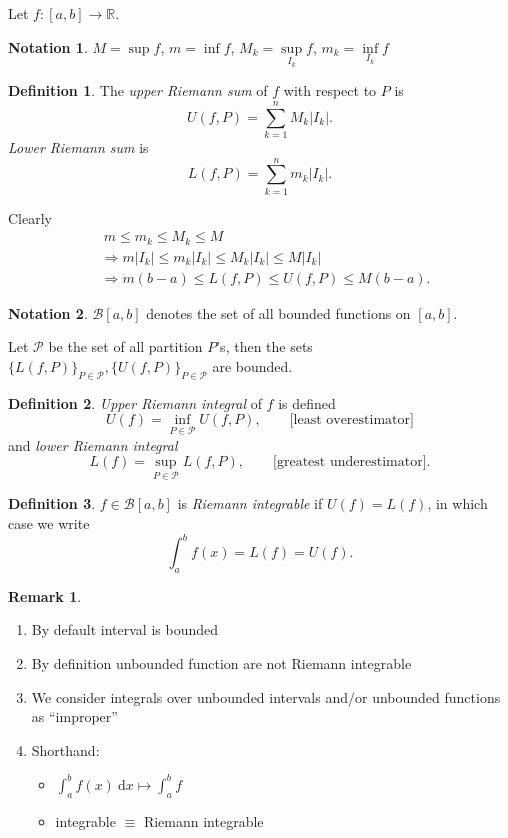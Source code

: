 \documentclass[a4paper]{article}
\theoremstyle{definition}
\newtheorem{defn}{Definition}[subsection]
\newtheorem*{remark}{Remark}
\newtheorem*{notation}{Notation}
\begin{document}
Let $f:[a,b]\rightarrow \mathbb R$.

\begin{notation}
	$M=\sup f$, $m=\inf f$, $M_k = \underset{I_k}{\sup} f$, $m_k = \underset{I_k}{\inf} f$
\end{notation}

\begin{defn}
The \textit{upper Riemann sum} of $f$ with respect to $P$ is
\[
U(f,P)=\sum_{k=1}^n M_k |I_k| .
\]
\textit{Lower Riemann sum} is
\[
L(f,P)=\sum_{k=1}^n m_k |I_k| .
\]
\end{defn}

Clearly
\[
\begin{aligned}
	&\ m \leq m_k \leq M_k \leq M  \\
	&\Rightarrow m|I_k| \leq m_k|I_k| \leq M_k|I_k| \leq M|I_k| \\
	&\Rightarrow m(b-a) \leq L(f,P) \leq U(f,P) \leq M(b-a) .
\end{aligned}
\]

\begin{notation}
	$\mathcal B[a,b]$ denotes the set of all bounded functions on $[a,b]$.
\end{notation}

Let $\mathcal P$ be the set of all partition $P$'s, then the sets $\{L(f,P)\}_{P\in \mathcal P},\{U(f,P)\}_{P\in \mathcal P}$ are bounded.

\begin{defn}
	\textit{Upper Riemann integral} of $f$ is defined
\[
U(f)=\underset{P\in \mathcal P}{\inf} U(f,P), \qquad \text{[least overestimator]}
\]
and \textit{lower Riemann integral}
\[
L(f)=\underset{P\in \mathcal P}{\sup} L(f,P), \qquad \text{[greatest underestimator]} .
\]
\end{defn}

\begin{defn}
	$f\in \mathcal B [a,b]$ is \textit{Riemann integrable} if $U(f)=L(f)$, in which case we write
\[
\int_a^b f(x)=L(f)=U(f) .
\]
\end{defn}

\begin{remark}
	\begin{enumerate}
		\item By default interval is bounded
		\item By definition unbounded function are not Riemann integrable
		\item We consider integrals over unbounded intervals and/or unbounded functions as ``improper''
		\item Shorthand:\begin{itemize}
			\item $\int_a^b f(x) \ \mathrm d x \mapsto \int_a^b f$
			\item integrable $\equiv$ Riemann integrable
		\end{itemize}
	\end{enumerate} 
\end{remark}
\end{document}
